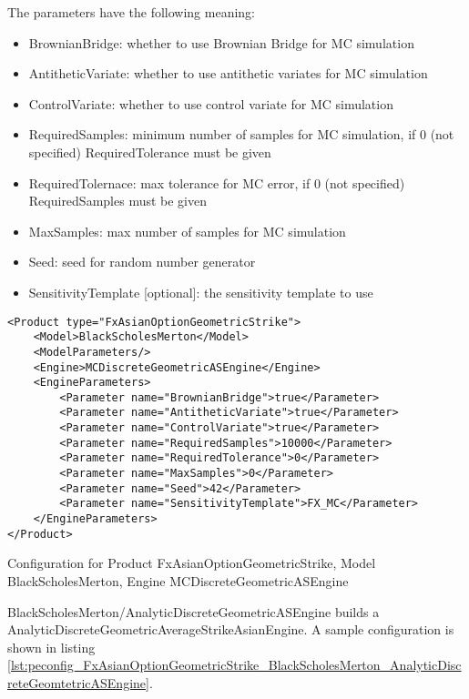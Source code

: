 The parameters have the following meaning:

\begin{itemize}
\item BrownianBridge: whether to use Brownian Bridge for MC simulation
\item AntitheticVariate: whether to use antithetic variates for MC simulation
\item ControlVariate: whether to use control variate for MC simulation
\item RequiredSamples: minimum number of samples for MC simulation, if 0 (not specified) RequiredTolerance must be given
\item RequiredTolernace: max tolerance for MC error, if 0 (not specified) RequiredSamples must be given
\item MaxSamples: max number of samples for MC simulation
\item Seed: seed for random number generator
\item SensitivityTemplate [optional]: the sensitivity template to use 
\end{itemize}

\begin{longlisting}
\begin{verbatim}
<Product type="FxAsianOptionGeometricStrike">
    <Model>BlackScholesMerton</Model>
    <ModelParameters/>
    <Engine>MCDiscreteGeometricASEngine</Engine>
    <EngineParameters>
        <Parameter name="BrownianBridge">true</Parameter>    
        <Parameter name="AntitheticVariate">true</Parameter>    
        <Parameter name="ControlVariate">true</Parameter>    
        <Parameter name="RequiredSamples">10000</Parameter>    
        <Parameter name="RequiredTolerance">0</Parameter>    
        <Parameter name="MaxSamples">0</Parameter>    
        <Parameter name="Seed">42</Parameter>    
        <Parameter name="SensitivityTemplate">FX_MC</Parameter>
    </EngineParameters>
</Product>
\end{verbatim}
\caption{Configuration for Product FxAsianOptionGeometricStrike, Model BlackScholesMerton, Engine MCDiscreteGeometricASEngine}
\label{lst:peconfig_FxAsianOptionGeometricStrike_BlackScholesMerton_MCDiscreteGeomtetricASEngine}
\end{longlisting}

BlackScholesMerton/AnalyticDiscreteGeometricASEngine builds a AnalyticDiscreteGeometricAverageStrikeAsianEngine. A sample
configuration is shown in listing
\ref{lst:peconfig_FxAsianOptionGeometricStrike_BlackScholesMerton_AnalyticDiscreteGeomtetricASEngine}.

